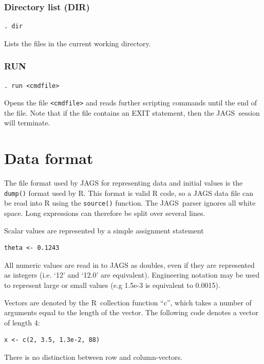 \documentclass[11pt, a4paper, titlepage]{report}
\newcommand{\JAGS}{\textsf{JAGS}}
\newcommand{\R}{\textsf{R}}
\begin{document}
\subsubsection{Directory list (DIR)}
\begin{verbatim}
. dir
\end{verbatim}
Lists the files in the current working directory.

\subsubsection{RUN}
\begin{verbatim}
. run <cmdfile>
\end{verbatim}
Opens the file \texttt{<cmdfile>} and reads further scripting commands
until the end of the file.  Note that if the file contains an EXIT
statement, then the \JAGS\ session will terminate. 

\section{Data format}
\label{section:cmdline:data}

The file format used by JAGS for representing data and initial values
is the \verb+dump()+ format used by R.  This format is valid R code,
so a JAGS data file can be read into R using the \verb+source()+ function.
The \JAGS\ parser ignores all white space.  Long expressions can
therefore be split over several lines.

Scalar values are represented by a simple assignment statement 
\begin{verbatim}
theta <- 0.1243
\end{verbatim}
All numeric values are read in to JAGS as doubles, even if they are
represented as integers (i.e. `12' and `12.0' are
equivalent). Engineering notation may be used to represent large or
small values (e.g 1.5e-3 is equivalent to 0.0015).

Vectors are denoted by the \R\ collection function ``c'', which takes
a number of arguments equal to the length of the vector.  The
following code denotes a vector of length 4:
\begin{verbatim}
x <- c(2, 3.5, 1.3e-2, 88)
\end{verbatim}
There is no distinction between row and column-vectors. 
\end{document}
